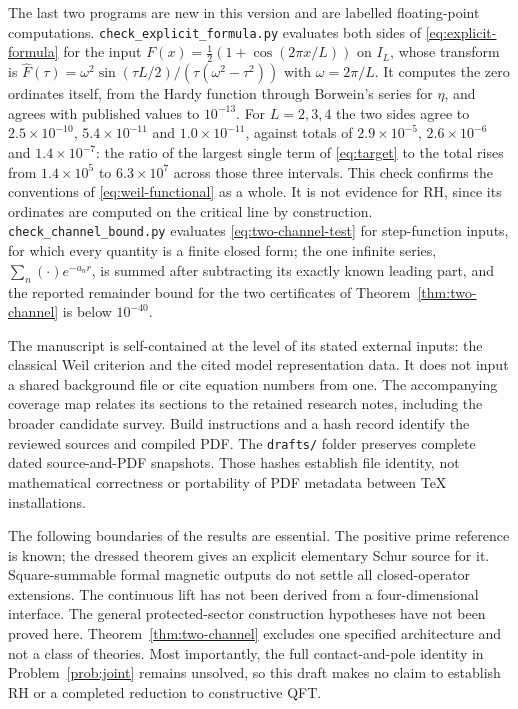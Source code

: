 The last two programs are new in this version and are labelled
floating-point computations. \texttt{check\_explicit\_formula.py} evaluates
both sides of \eqref{eq:explicit-formula} for the input
$F(x)=\tfrac12(1+\cos(2\pi x/L))$ on $I_L$, whose transform is
$\widehat F(\tau)=\omega^2\sin(\tau L/2)/(\tau(\omega^2-\tau^2))$ with
$\omega=2\pi/L$. It computes the zero ordinates itself, from the Hardy
function through Borwein's series for $\eta$, and agrees with published
values to $10^{-13}$. For $L=2,3,4$ the two sides agree to
$2.5\times10^{-10}$, $5.4\times10^{-11}$ and $1.0\times10^{-11}$, against
totals of $2.9\times10^{-5}$, $2.6\times10^{-6}$ and $1.4\times10^{-7}$:
the ratio of the largest single term of \eqref{eq:target} to the total rises
from $1.4\times10^5$ to $6.3\times10^7$ across those three intervals. This
check confirms the conventions of \eqref{eq:weil-functional} as a whole. It
is not evidence for RH, since its ordinates are computed on the critical
line by construction.
\texttt{check\_channel\_bound.py} evaluates \eqref{eq:two-channel-test} for
step-function inputs, for which every quantity is a finite closed form; the
one infinite series, $\sum_n(\cdot)e^{-a_nr}$, is summed after subtracting
its exactly known leading part, and the reported remainder bound for the two
certificates of Theorem~\ref{thm:two-channel} is below $10^{-40}$.

The manuscript is self-contained at the level of its stated external
inputs: the classical Weil criterion and the cited model representation
data. It does not input a shared background file or cite equation numbers
from one. The accompanying coverage map relates its sections to the
retained research notes, including the broader candidate survey.
Build instructions and a hash record identify the reviewed sources and
compiled PDF. The \texttt{drafts/} folder preserves complete dated
source-and-PDF snapshots. Those hashes establish file identity, not
mathematical correctness or portability of PDF metadata between TeX
installations.

The following boundaries of the results are essential. The positive
prime reference is known; the dressed theorem gives an explicit
elementary Schur source for it. Square-summable formal magnetic
outputs do not settle all closed-operator extensions. The continuous
lift has not been derived from a four-dimensional interface. The
general protected-sector construction hypotheses have not been
proved here. Theorem~\ref{thm:two-channel} excludes one specified
architecture and not a class of theories. Most importantly, the full
contact-and-pole identity in Problem~\ref{prob:joint} remains unsolved, so
this draft makes no claim to establish RH or a completed reduction to
constructive QFT.
